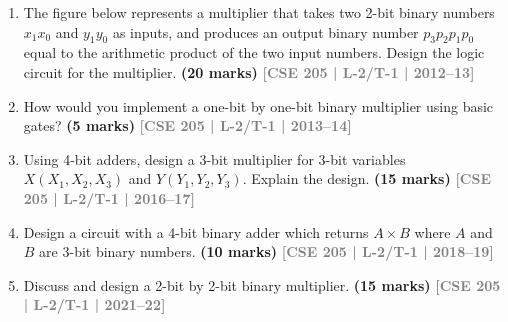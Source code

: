 \documentclass[12pt,a4paper]{article}
\newcommand{\yr}[1]{\hfill\textcolor{gray}{\small\textbf{[#1]}}}
\newcommand{\mk}[1]{\textcolor{orange!70!black}{\small\textbf{(#1 marks)}}}
\begin{document}
\begin{enumerate}

\item The figure below represents a multiplier that takes two 2-bit binary numbers $x_1x_0$ and $y_1y_0$ as inputs, and produces an output binary number $p_3p_2p_1p_0$ equal to the arithmetic product of the two input numbers. Design the logic circuit for the multiplier.
\mk{20} \yr{CSE 205 | L-2/T-1 | 2012--13}

\begin{center}
\end{center}

\item How would you implement a one-bit by one-bit binary multiplier using basic gates?
\mk{5} \yr{CSE 205 | L-2/T-1 | 2013--14}


\item Using 4-bit adders, design a 3-bit multiplier for 3-bit variables $X(X_1,X_2,X_3)$ and $Y(Y_1,Y_2,Y_3)$. Explain the design.
\mk{15} \yr{CSE 205 | L-2/T-1 | 2016--17}

\item Design a circuit with a 4-bit binary adder which returns $A \times B$ where $A$ and $B$ are 3-bit binary numbers.
\mk{10} \yr{CSE 205 | L-2/T-1 | 2018--19}

\item Discuss and design a 2-bit by 2-bit binary multiplier.
\mk{15} \yr{CSE 205 | L-2/T-1 | 2021--22}

\end{enumerate}
\end{document}
